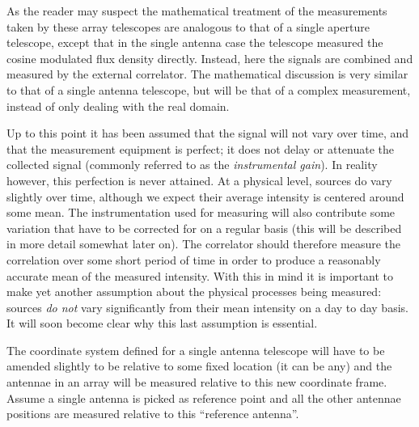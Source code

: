 As the reader may suspect the mathematical treatment of the measurements taken by these array telescopes are analogous
to that of a single aperture telescope, except that in the single antenna case the telescope measured the cosine modulated
flux density directly. Instead, here the signals are combined and measured by the external correlator. The mathematical 
discussion is very similar to that of a single antenna telescope, but will be that of a complex measurement, 
instead of only dealing with the real domain.

Up to this point it has been assumed that the signal will not vary over time, and that the measurement equipment is perfect; it 
does not delay or attenuate the collected signal (commonly referred to as the \textit{instrumental gain}). In reality however, 
this perfection is never attained. At a physical level, sources do vary slightly over time, although we expect their average 
intensity is centered around some mean. The instrumentation used for measuring will also contribute some variation that have to 
be corrected for on a regular basis (this will be described in more detail somewhat later on). The correlator should therefore 
measure the correlation over some short period of time in order to produce a reasonably accurate mean of the measured intensity. 
With this in mind it is important to make yet another assumption about the physical processes being measured: sources \textit{do not} 
vary significantly from their mean intensity on a day to day basis. It will soon become clear why this last assumption is essential.

The coordinate system defined for a single antenna telescope will have to be amended slightly to be relative to some fixed
location (it can be any) and the antennae in an array will be measured relative to this new coordinate frame. Assume
a single antenna is picked as reference point and all the other antennae positions are measured relative to this ``reference 
antenna''. 

